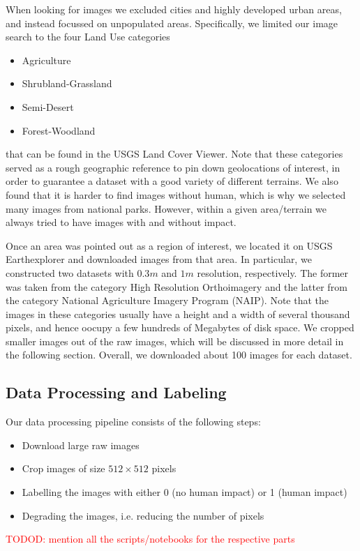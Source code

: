 When looking for images we excluded cities and highly developed urban areas, and instead focussed on unpopulated areas. Specifically, we limited our image search to the four Land Use categories
\begin{itemize}
	\item Agriculture
	\item Shrubland-Grassland
	\item Semi-Desert
	\item Forest-Woodland
\end{itemize}
that can be found in the USGS Land Cover Viewer. Note that these categories served as a rough geographic reference to pin down geolocations of interest, in order to guarantee a dataset with a good variety of different terrains. We also found that it is harder to find images without human, which is why we selected many images from national parks. However, within a given area/terrain we always tried to have images with and without impact.

Once an area was pointed out as a region of interest, we located it on USGS Earthexplorer and downloaded images from that area. In particular, we constructed two datasets with $0.3m$ and $1m$ resolution, respectively. The former was taken from the category High Resolution Orthoimagery and the latter from the category National Agriculture Imagery Program (NAIP). Note that the images in these categories usually have a height and a width of several thousand pixels, and hence oocupy a few hundreds of Megabytes of disk space. We cropped smaller images out of the raw images, which will be discussed in more detail in the following section. Overall, we downloaded about 100 images for each dataset.


\subsection{Data Processing and Labeling}
Our data processing pipeline consists of the following steps:
\begin{itemize}
	\item Download large raw images
	\item Crop images of size $512\times512$ pixels
	\item Labelling the images with either 0 (no human impact) or 1 (human impact)
	\item Degrading the images, i.e. reducing the number of pixels
\end{itemize}

\textcolor{red}{TODOD: mention all the scripts/notebooks for the respective parts}

